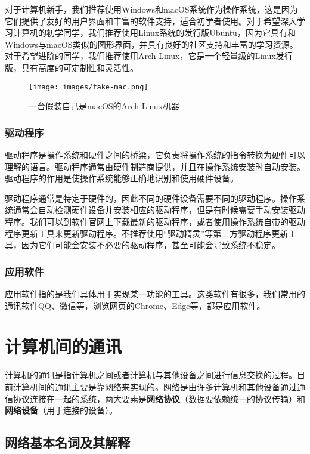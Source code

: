 \documentclass[../main.tex]{subfiles}
\begin{document}
对于计算机新手，我们推荐使用Windows和macOS系统作为操作系统，这是因为它们提供了友好的用户界面和丰富的软件支持，适合初学者使用。对于希望深入学习计算机的初学同学，我们推荐使用Linux系统的发行版Ubuntu，因为它具有和Windows与macOS类似的图形界面，并具有良好的社区支持和丰富的学习资源。对于希望进阶的同学，我们推荐使用Arch Linux，它是一个轻量级的Linux发行版，具有高度的可定制性和灵活性。

\begin{figure}[ht]
  \centering
  \texttt{[image: images/fake-mac.png]}
  \caption{一台假装自己是macOS的Arch Linux机器}
\end{figure}

\subsubsection{驱动程序}

驱动程序是操作系统和硬件之间的桥梁，它负责将操作系统的指令转换为硬件可以理解的语言。驱动程序通常由硬件制造商提供，并且在操作系统安装时自动安装。驱动程序的作用是使操作系统能够正确地识别和使用硬件设备。

驱动程序通常是特定于硬件的，因此不同的硬件设备需要不同的驱动程序。操作系统通常会自动检测硬件设备并安装相应的驱动程序，但是有时候需要手动安装驱动程序。我们可以到软件官网上下载最新的驱动程序，或者使用操作系统自带的驱动程序更新工具来更新驱动程序。不推荐使用“驱动精灵”等第三方驱动程序更新工具，因为它们可能会安装不必要的驱动程序，甚至可能会导致系统不稳定。

\subsubsection{应用软件}

应用软件指的是我们具体用于实现某一功能的工具。这类软件有很多，我们常用的通讯软件QQ、微信等，浏览网页的Chrome、Edge等，都是应用软件。

\section{计算机间的通讯}

计算机的通讯是指计算机之间或者计算机与其他设备之间进行信息交换的过程。目前计算机间的通讯主要是靠网络来实现的。网络是由许多计算机和其他设备通过通信协议连接在一起的系统，两大要素是\textbf{网络协议}（数据要依赖统一的协议传输）和\textbf{网络设备}（用于连接的设备）。

\subsection{网络基本名词及其解释}
\end{document}

